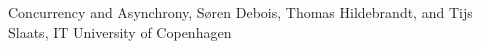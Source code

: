 \begin{thebibliography}{99}
 Concurrency and Asynchrony, 
Søren Debois, Thomas Hildebrandt, and Tijs Slaats, IT University of Copenhagen

\end{thebibliography}